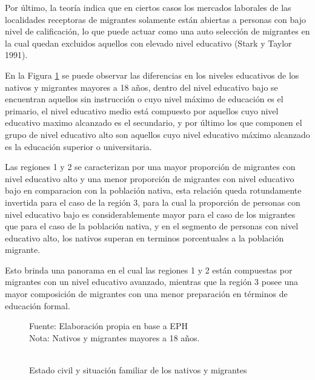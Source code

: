 \documentclass[12pt,a4paper]{article}
\begin{document}
Por último, la teoría indica que en ciertos casos los mercados laborales de las localidades receptoras de migrantes solamente están abiertas a personas con bajo nivel de calificación, lo que puede actuar como una auto selección de migrantes en la cual quedan excluidos aquellos con elevado nivel educativo (Stark y Taylor 1991).

En la Figura \ref{figure:niveled_mig} se puede observar las diferencias en los niveles educativos de los nativos y migrantes mayores a 18 años, dentro del nivel educativo bajo se encuentran aquellos sin instrucción o cuyo nivel máximo de educación es el primario, el nivel educativo medio está compuesto por aquellos cuyo nivel educativo maximo alcanzado es el secundario, y por último los que componen el grupo de nivel educativo alto son aquellos cuyo nivel educativo máximo alcanzado es la educación superior o universitaria.

Las regiones 1 y 2 se caracterizan por una mayor proporción de migrantes con nivel educativo alto y una menor proporción de migrantes con nivel educativo bajo en comparacion con la población nativa, esta relación queda rotundamente invertida para el caso de la región 3, para la cual la proporción de personas con nivel educativo bajo es considerablemente mayor para el caso de los migrantes que para el caso de la población nativa, y en el segmento de personas con nivel educativo alto, los nativos superan en terminos porcentuales a la población migrante.

Esto brinda una panorama en el cual las regiones 1 y 2 están compuestas por migrantes con un nivel educativo avanzado, mientras que la región 3 posee una mayor composición de migrantes con una menor preparación en términos de educación formal.

\begin{figure}[ht!]
\begin{center}
\caption{\\Estado civil y situación familiar de los nativos y migrantes}
\label{figure:niveled_mig}
 
\end{center}
\begin{flushleft}
\begin{scriptsize}
Fuente: Elaboración propia en base a EPH\\
Nota: Nativos y migrantes mayores a 18 años.
\end{scriptsize}
\end{flushleft}
\end{figure}
\end{document}
